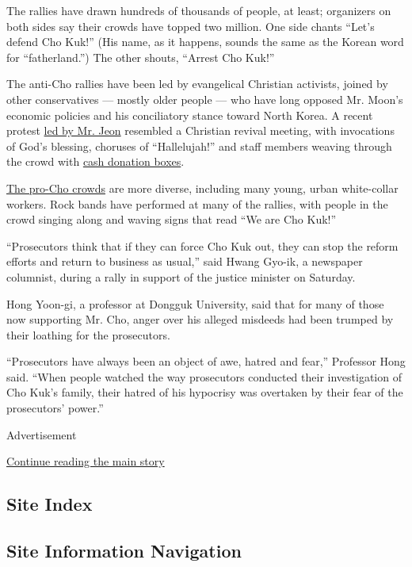 The rallies have drawn hundreds of thousands of people, at least;
organizers on both sides say their crowds have topped two million. One
side chants ``Let's defend Cho ​Kuk!'' (His name, as it happens, sounds
the same as the Korean word for ``fatherland.'') The other shouts,
``Arrest Cho Kuk!''

The anti-Cho rallies have been led by ​evangelical Christian activists,
joined by other conservatives --- mostly older people --- who have long
opposed Mr. Moon's economic policies and his conciliatory stance toward
North Korea. A recent protest
\href{https://www.youtube.com/watch?v=-Ym1zeAV5UA}{led by Mr. Jeon}
resembled a Christian revival meeting, with invocations of God's
blessing, choruses of ``Hallelujah!'' and staff members weaving through
the crowd with \href{https://www.youtube.com/watch?v=GGO4vYV0OQ4}{cash
donation boxes}.

\href{https://www.youtube.com/watch?v=7KxAqTnlBJU}{The pro-Cho crowds}
are more diverse, including many young, urban white-collar workers. Rock
bands have performed at many of the rallies, with people in the crowd
singing along and waving signs that read ``We are Cho Kuk!''

``Prosecutors think that if they can force Cho Kuk out, they can stop
the reform efforts and return to business as usual,'' said Hwang Gyo-ik,
a newspaper columnist, during a rally in support of the justice minister
on Saturday.

Hong Yoon-gi, a professor at Dongguk University, said that for many of
those now supporting Mr. Cho, anger over his alleged misdeeds had been
trumped by their loathing for the prosecutors.

``Prosecutors have always been an object of awe, hatred and fear,''
Professor Hong said. ``When people watched the way prosecutors conducted
their investigation of Cho Kuk's family, their hatred of his hypocrisy
was overtaken by their fear of the prosecutors' power.''

Advertisement

\protect\hyperlink{after-bottom}{Continue reading the main story}

\hypertarget{site-index}{%
\subsection{Site Index}\label{site-index}}

\hypertarget{site-information-navigation}{%
\subsection{Site Information
Navigation}\label{site-information-navigation}}

